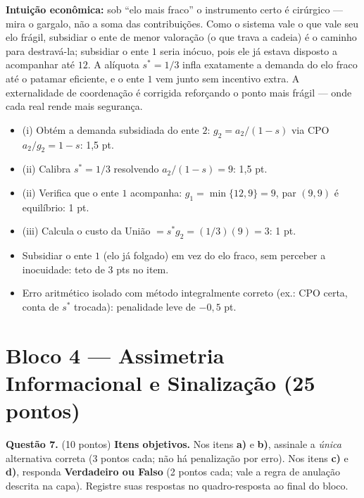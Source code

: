 \begin{solucao}
\textbf{Intuição econômica:} sob ``elo mais fraco'' o instrumento certo é cirúrgico --- mira o gargalo, não a soma das contribuições. Como o sistema vale o que vale seu elo frágil, subsidiar o ente de menor valoração (o que trava a cadeia) é o caminho para destravá-la; subsidiar o ente $1$ seria inócuo, pois ele já estava disposto a acompanhar até $12$. A alíquota $s^{*}=1/3$ infla exatamente a demanda do elo fraco até o patamar eficiente, e o ente $1$ vem junto sem incentivo extra. A externalidade de coordenação é corrigida reforçando o ponto mais frágil --- onde cada real rende mais segurança.
\rubricalabel
\begin{itemize}
\item (i) Obtém a demanda subsidiada do ente $2$: $g_2=a_2/(1-s)$ via CPO $a_2/g_2=1-s$: 1{,}5 pt.
\item (ii) Calibra $s^{*}=1/3$ resolvendo $a_2/(1-s)=9$: 1{,}5 pt.
\item (ii) Verifica que o ente $1$ acompanha: $g_1=\min\{12,9\}=9$, par $(9,9)$ é equilíbrio: 1 pt.
\item (iii) Calcula o custo da União $=s^{*}g_2=(1/3)(9)=3$: 1 pt.
\item Subsidiar o ente $1$ (elo já folgado) em vez do elo fraco, sem perceber a inocuidade: teto de 3 pts no item.
\item Erro aritmético isolado com método integralmente correto (ex.: CPO certa, conta de $s^{*}$ trocada): penalidade leve de $-0{,}5$ pt.
\end{itemize}
\end{solucao}



\section*{Bloco 4 --- Assimetria Informacional e Sinalização \hfill \normalsize (25 pontos)}

\textbf{Questão 7.} (10 pontos) \textbf{Itens objetivos.} Nos itens \textbf{a)} e \textbf{b)}, assinale a \emph{única} alternativa correta (3 pontos cada; não há penalização por erro). Nos itens \textbf{c)} e \textbf{d)}, responda \textbf{Verdadeiro ou Falso} (2 pontos cada; vale a regra de anulação descrita na capa). Registre suas respostas no quadro-resposta ao final do bloco.

